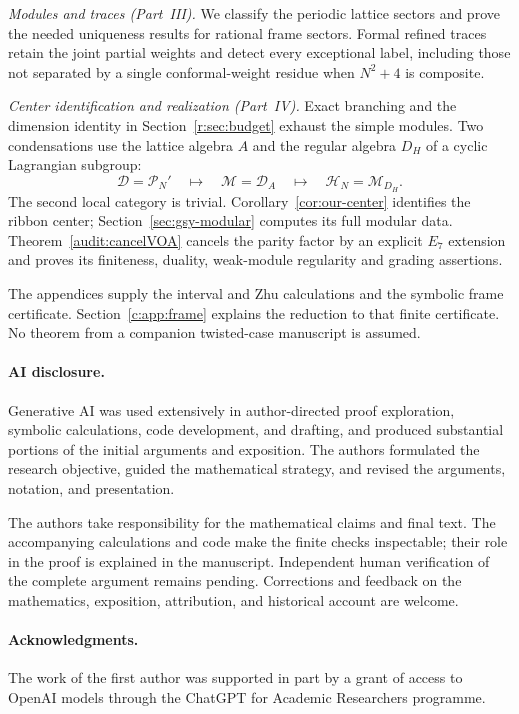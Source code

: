 \documentclass[11pt,a4paper]{article}
\numberwithin{equation}{section}
\theoremstyle{definition}\newtheorem{definition}[theorem]{Definition}
\theoremstyle{remark}\newtheorem{remark}[theorem]{Remark}
\begin{document}
\emph{Modules and traces (Part~III).}
We classify the periodic lattice sectors and prove the needed
uniqueness results for rational frame sectors. Formal refined
traces retain the joint partial weights and detect every exceptional
label, including those not separated by a single conformal-weight
residue when $N^2+4$ is composite.

\emph{Center identification and realization (Part~IV).}
Exact branching and the dimension identity in
Section~\ref{r:sec:budget} exhaust the simple modules. Two
condensations use the lattice algebra $A$ and the regular algebra
$D_H$ of a cyclic Lagrangian subgroup:
\[
 \mathcal D=\mathcal P_N'
 \quad\longmapsto\quad \mathcal M=\mathcal D_A
 \quad\longmapsto\quad \mathcal H_N=\mathcal M_{D_H}.
\]
The second local category is trivial.
Corollary~\ref{cor:our-center} identifies the ribbon center;
Section~\ref{sec:gsy-modular} computes its full modular data.
Theorem~\ref{audit:cancelVOA} cancels the parity factor by an explicit
$E_7$ extension and proves its finiteness, duality, weak-module
regularity and grading assertions.

The appendices supply the interval and Zhu calculations and the
symbolic frame certificate. Section~\ref{c:app:frame} explains the
reduction to that finite certificate. No theorem from a companion
twisted-case manuscript is assumed.

\paragraph{AI disclosure.}
Generative AI was used extensively in author-directed proof
exploration, symbolic calculations, code development, and drafting,
and produced substantial portions of the initial arguments and
exposition. The authors formulated the research objective, guided
the mathematical strategy, and revised the arguments, notation,
and presentation.

The authors take responsibility for the mathematical claims and
final text. The accompanying calculations and code make the finite
checks inspectable; their role in the proof is explained in the
manuscript. Independent human verification of the complete argument
remains pending. Corrections and feedback on the mathematics,
exposition, attribution, and historical account are welcome.

\paragraph{Acknowledgments.}
The work of the first author was supported in part by a grant of access to OpenAI models through the ChatGPT for Academic Researchers programme.
\end{document}
